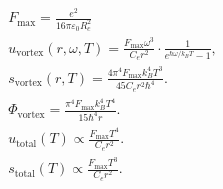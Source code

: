 \begin{gather*}
        F_{\text{max}} = \frac{e^2}{16 \pi \varepsilon_0 R_c^2}\\
        u_{\text{vortex}}(r, \omega, T) = \frac{F_\text{max} \omega^3}{C_e r^2} \cdot \frac{1}{e^{\hbar \omega / k_B T} - 1},\\
        s_{\text{vortex}}(r, T) = \frac{4 \pi^4 F_\text{max} k_B^4 T^3}{45 C_e r^2 \hbar^4}.\\
        \Phi_{\text{vortex}} = \frac{\pi^4 F_\text{max} k_B^4 T^4}{15 \hbar^4 r}.\\
        u_{\text{total}}(T) \propto \frac{F_\text{max} T^4}{C_e r^2}.\\
        s_{\text{total}}(T) \propto \frac{F_\text{max} T^3}{C_e r^2}.\\
    \end{gather*}





